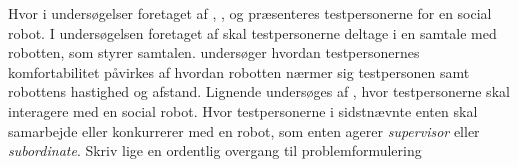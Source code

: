 Hvor i undersøgelser foretaget af \textcite[s. 1480]{PDF:ExploringInfluencingVariable}, \textcite[ss. 190-191]{PDF:PsychologicalEffects}, \textcite[s. 173]{PDF:HowMayIServeYou} og \textcite[ss. 786-787]{PDF:HowSocialDistanceShapesHRI} præsenteres testpersonerne for en social robot. I undersøgelsen foretaget af \textcite[s. 1480]{PDF:ExploringInfluencingVariable} skal testpersonerne deltage i en samtale med robotten, som styrer samtalen. \textcite[ss. 190-191]{PDF:PsychologicalEffects} undersøger hvordan testpersonernes komfortabilitet påvirkes af hvordan robotten nærmer sig testpersonen samt robottens hastighed og afstand. Lignende undersøges af \textcite[s. 173]{PDF:HowMayIServeYou}, hvor testpersonerne skal interagere med en social robot. Hvor testpersonerne i sidstnævnte enten skal samarbejde eller konkurrerer med en robot, som enten agerer \textit{supervisor} eller \textit{subordinate}.\blankline
%
Skriv lige en ordentlig overgang til problemformulering
  
  
  
  


